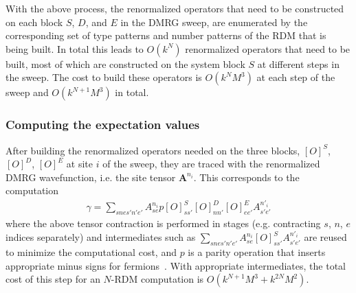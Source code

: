 
With the above process, the renormalized operators that need to be constructed  on each block $S$, $D$, and $E$ 
in the DMRG sweep, are enumerated
by the corresponding set of type patterns and number patterns of the RDM that is being built. In total this leads to $O(k^N)$ renormalized
operators that need to be built, most of which are constructed on the system block $S$ at different steps in the sweep. The cost to build these operators 
is $O(k^NM^3)$ at each step of the sweep and $O(k^{N+1}M^3)$ in total.   

\subsubsection{Computing the expectation values}

After building the renormalized operators needed on the three blocks, $[O]^S$, $[O]^D$, $[O]^E$ at site $i$ of the sweep, they are
traced with the renormalized DMRG wavefunction, i.e. the site tensor $\mathbf{A}^{n_i}$. 
This corresponds to the computation
\begin{align}
\gamma = \sum_{snes'n'e'} A^{n_i}_{se} p [O]^S_{ss'} [O]^D_{nn'} [O]^E_{ee'} A^{n'_i}_{s'e'} 
\end{align}
where the above tensor contraction is performed in stages (e.g. contracting $s$, $n$, $e$ indices separately) and intermediates such as $\sum_{snes'n'e'}A^{n_i}_{se}[O]^S_{ss'}A^{n'_i}_{s'e'}$ are reused to minimize the computational cost,
and $p$ is a parity operation that inserts appropriate minus signs for fermions~\cite{chan_highly_2002}. 
With appropriate intermediates, the total cost of this step for an $N$-RDM computation is $O(k^{N+1}M^3+k^{2N}M^2)$.


